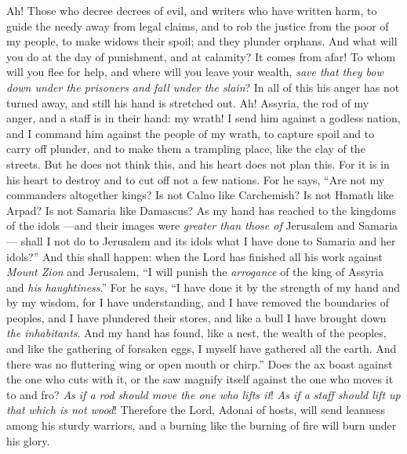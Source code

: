 \begin{biblechapter} %
 Ah! Those who decree decrees of evil, 
and writers who have written harm,
\verse to guide the needy away from legal claims, 
and to rob the justice from the poor of my people, 
to make widows their spoil; 
and they plunder orphans.
\verse And what will you do at the day of punishment, 
and at calamity? It comes from afar! 
To whom will you flee for help, 
and where will you leave your wealth,
\verse \textit{save that they bow down under the prisoners 
and fall under the slain}? 
In all of this his anger has not turned away, 
and still his hand is stretched out.
 Ah! Assyria, the rod of my anger, 
and a staff is in their hand: my wrath!
\verse I send him against a godless nation, 
and I command him against the people of my wrath, 
to capture spoil 
and to carry off plunder, 
and to make them a trampling place, 
like the clay of the streets.
\verse But he does not think this, 
and his heart does not plan this. 
For it is in his heart to destroy 
and to cut off not a few nations.
\verse For he says, “Are not my commanders altogether kings?
\verse Is not Calno like Carchemish? 
Is not Hamath like Arpad? 
Is not Samaria like Damascus?
\verse As my hand has reached to the kingdoms of the idols 
—and their images were \textit{greater than those of} Jerusalem and Samaria—
\verse shall I not do to Jerusalem and its idols 
what I have done to Samaria and her idols?”
\verse And this shall happen: when the Lord has finished all his work against \textit{Mount Zion} and Jerusalem, “I will punish the \textit{arrogance} of the king of Assyria and \textit{his haughtiness}.”
\verse For he says,
\verse “I have done it by the strength of my hand 
and by my wisdom, for I have understanding, 
and I have removed the boundaries of peoples, 
and I have plundered their stores, 
and like a bull I have brought down \textit{the inhabitants}.
\verse And my hand has found, like a nest, the wealth of the peoples, 
and like the gathering of forsaken eggs, I myself have gathered all the earth. 
And there was no fluttering wing or open mouth or chirp.”
\verse Does the ax boast against the one who cuts with it, 
or the saw magnify itself against the one who moves it to and fro? 
\textit{As if a rod should move the one who lifts it}! 
\textit{As if a staff should lift up that which is not wood}!
\verse Therefore the Lord, Adonai of hosts, will send leanness among his sturdy warriors, 
and a burning like the burning of fire will burn under his glory.

\end{biblechapter}
